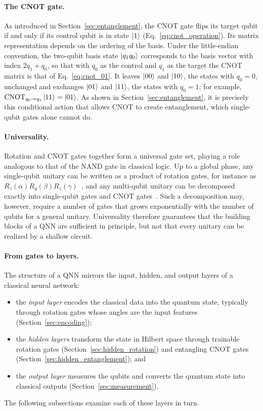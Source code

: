 \documentclass[12pt]{article}
\numberwithin{equation}{section}  %
\begin{document}
\paragraph{The CNOT gate.} As introduced in Section~\ref{sec:entanglement}, the CNOT gate flips its target qubit if and only if its control qubit is in state $\ket{1}$ (Eq.~\eqref{eq:cnot_operation}). Its matrix representation depends on the ordering of the basis. Under the little-endian convention, the two-qubit basis state $\ket{q_1 q_0}$ corresponds to the basis vector with index $2q_1 + q_0$, so that with $q_0$ as the control and $q_1$ as the target the CNOT matrix is that of Eq.~\eqref{eq:cnot_01}. It leaves $\ket{00}$ and $\ket{10}$, the states with $q_0 = 0$, unchanged and exchanges $\ket{01}$ and $\ket{11}$, the states with $q_0 = 1$; for example, $\mathrm{CNOT}_{q_0 \to q_1}\ket{11} = \ket{01}$. As shown in Section~\ref{sec:entanglement}, it is precisely this conditional action that allows CNOT to create entanglement, which single-qubit gates alone cannot do.

\paragraph{Universality.} Rotation and CNOT gates together form a universal gate set, playing a role analogous to that of the NAND gate in classical logic. Up to a global phase, any single-qubit unitary can be written as a product of rotation gates, for instance as $R_z(\alpha) R_y(\beta) R_z(\gamma)$~\cite[Sec.~4.2]{nielsen2010quantum}, and any multi-qubit unitary can be decomposed exactly into single-qubit gates and CNOT gates~\cite{barenco1995elementary}. Such a decomposition may, however, require a number of gates that grows exponentially with the number of qubits for a general unitary. Universality therefore guarantees that the building blocks of a QNN are sufficient in principle, but not that every unitary can be realized by a shallow circuit.

\paragraph{From gates to layers.} The structure of a QNN mirrors the input, hidden, and output layers of a classical neural network:
\begin{itemize}
\item the \emph{input layer} encodes the classical data into the quantum state, typically through rotation gates whose angles are the input features (Section~\ref{sec:encoding});
\item the \emph{hidden layers} transform the state in Hilbert space through trainable rotation gates (Section~\ref{sec:hidden_rotation}) and entangling CNOT gates (Section~\ref{sec:hidden_entanglement}); and
\item the \emph{output layer} measures the qubits and converts the quantum state into classical outputs (Section~\ref{sec:measurement}).
\end{itemize}
The following subsections examine each of these layers in turn.
\end{document}
